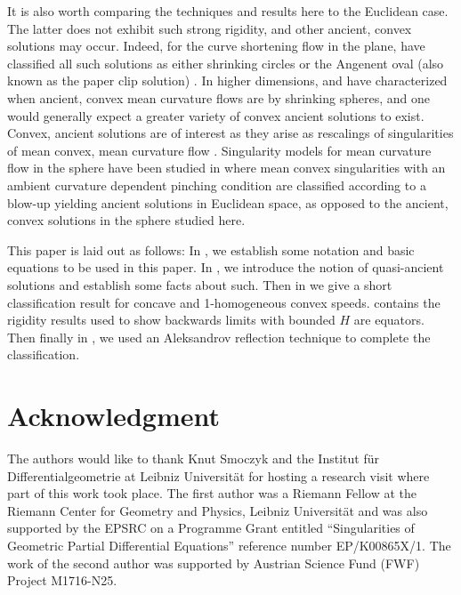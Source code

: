 \documentclass{amsart}
\begin{document}
It is also worth comparing the techniques and results here to the Euclidean case. The latter does not exhibit such strong rigidity, and other ancient, convex solutions may occur. Indeed, for the curve shortening flow in the plane, \cite{DaskalopoulosHamiltonSesum:2010} have classified all such solutions as either shrinking circles or the Angenent oval (also known as the paper clip solution) \cite{Angenent:1992}. In higher dimensions, \cite{HuiskenSinestrari:05/2014} and \cite{HaslhoferHershkovits:08/2013} have characterized when ancient, convex mean curvature flows are by shrinking spheres, and one would generally expect a greater variety of convex ancient solutions to exist. Convex, ancient solutions are of interest as they arise as rescalings of singularities \cite{HuiskenSinestrari:01/1999} of mean convex, mean curvature flow \cite{HuiskenSinestrari:09/1999, White:10/2002}. Singularity models for mean curvature flow in the sphere have been studied in \cite{Nguyen:2015} where mean convex singularities with an ambient curvature dependent pinching condition are classified according to a blow-up yielding ancient solutions in Euclidean space, as opposed to the ancient, convex solutions in the sphere studied here.

This paper is laid out as follows: In , we establish some notation and basic equations to be used in this paper. In , we introduce the notion of quasi-ancient solutions and establish some facts about such. Then in  we give a short classification result for concave and 1-homogeneous convex speeds.  contains the rigidity results used to show backwards limits with bounded \(H\) are equators. Then finally in , we used an Aleksandrov reflection technique to complete the classification.

\section*{Acknowledgment}

The authors would like to thank Knut Smoczyk and the Institut f\"{u}r Differentialgeometrie at Leibniz Universität for hosting a research visit where part of this work took place. The first author was a Riemann Fellow at the Riemann Center for Geometry and Physics, Leibniz Universit\"{a}t and was also supported by the EPSRC on a Programme Grant entitled ``Singularities of Geometric Partial Differential Equations'' reference number EP/K00865X/1. The work of the second author was supported by Austrian Science Fund (FWF) Project M1716-N25.
\end{document}
